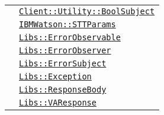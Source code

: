 \begin{longtable}{|>{\centering}m{3cm}|m{10cm}<{\centering}|}
& \hyperref[Client::Utility::BoolSubject]{\texttt{Client::Utility::BoolSubject}}\\
& \hyperref[IBMWatson::STTParams]{\texttt{IBMWatson::STTParams}}\\
& \hyperref[Libs::ErrorObservable]{\texttt{Libs::ErrorObservable}}\\
& \hyperref[Libs::ErrorObserver]{\texttt{Libs::ErrorObserver}}\\
& \hyperref[Libs::ErrorSubject]{\texttt{Libs::ErrorSubject}}\\
& \hyperref[Libs::Exception]{\texttt{Libs::Exception}}\\
& \hyperref[Libs::ResponseBody]{\texttt{Libs::ResponseBody}}\\
& \hyperref[Libs::VAResponse]{\texttt{Libs::VAResponse}}\\ \hline


\end{longtable}
